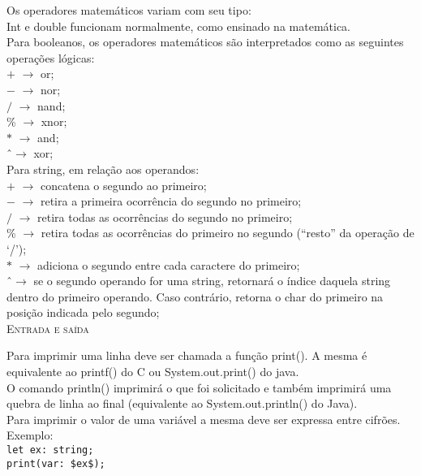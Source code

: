 \documentclass[12pt,a4paper]{article}
\begin{document}
Os operadores matemáticos variam com seu tipo:\\
Int e double funcionam normalmente, como ensinado na matemática.\\

Para booleanos, os operadores matemáticos são interpretados como as seguintes operações lógicas:\\[0.2cm]
$+$ $\rightarrow$ or;\\
$-$ $\rightarrow$ nor;\\
$/$ $\rightarrow$ nand;\\
\% $\rightarrow$ xnor;\\
$*$ $\rightarrow$ and;\\
\^ \ $\rightarrow$ xor;\\

Para string, em relação aos operandos:\\[0.15cm]
$+$ $\rightarrow$ concatena o segundo ao primeiro;\\
$-$ $\rightarrow$ retira a primeira ocorrência do segundo no primeiro;\\
$/$ $\rightarrow$ retira todas as ocorrências do segundo no primeiro;\\
\% $\rightarrow$ retira todas as ocorrências do primeiro no segundo (``resto'' da operação de `/');\\
$*$ $\rightarrow$ adiciona o segundo entre cada caractere do primeiro;\\
\^ \ $\rightarrow$ se o segundo operando for uma string, retornará o índice daquela string dentro do primeiro operando. Caso contrário, retorna o char do primeiro na posição indicada pelo segundo;\\[0.3cm]

\hypertarget{label1}{\Large{\textsc{Entrada e saída}}}\\
\normalsize

Para imprimir uma linha deve ser chamada a função print(). A mesma é equivalente ao printf() do C ou System.out.print() do java.\\
O comando println() imprimirá o que foi solicitado e também imprimirá uma quebra de linha ao final (equivalente ao System.out.println() do Java).\\

Para imprimir o valor de uma variável a mesma deve ser expressa entre cifrões. Exemplo: \\

\texttt{\noindent let ex: string;\\
\indent print(var: \$ex\$);} \\
\end{document}
